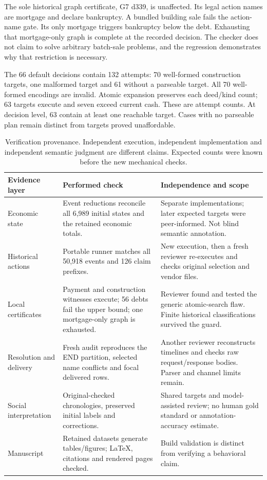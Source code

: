 The sole historical graph certificate, G7 d339, is unaffected. Its legal action names are mortgage and declare bankruptcy. A bundled building sale fails the action-name gate. Its only mortgage triggers bankruptcy below the debt. Exhausting that mortgage-only graph is complete at the recorded decision. The checker does not claim to solve arbitrary batch-sale problems, and the regression demonstrates why that restriction is necessary.

The 66 default decisions contain 132 attempts: 70 well-formed construction targets, one malformed target and 61 without a parseable target. All 70 well-formed encodings are invalid. Atomic expansion preserves each deed/kind count; 63 targets execute and seven exceed current cash. These are attempt counts. At decision level, 63 contain at least one reachable target. Cases with no parseable plan remain distinct from targets proved unaffordable.



\begin{table}[htbp]
\centering\small
\begin{tabularx}{\linewidth}{@{}L{2.9cm}YY@{}}
\toprule
Evidence layer & Performed check & Independence and scope\\\midrule
Economic state & Event reductions reconcile all 6,989 initial states and the retained economic totals. & Separate implementations; later expected targets were peer-informed. Not blind semantic annotation.\\
Historical actions & Portable runner matches all 50,918 events and 126 claim prefixes. & New execution, then a fresh reviewer re-executes and checks original selection and vendor files.\\
Local certificates & Payment and construction witnesses execute; 56 debts fail the upper bound; one mortgage-only graph is exhausted. & Reviewer found and tested the generic atomic-search flaw. Finite historical classifications survived the guard.\\
Resolution and delivery & Fresh audit reproduces the END partition, selected name conflicts and focal delivered rows. & Another reviewer reconstructs timelines and checks raw request/response bodies. Parser and channel limits remain.\\
Social interpretation & Original-checked chronologies, preserved initial labels and corrections. & Shared targets and model-assisted review; no human gold standard or annotation-accuracy estimate.\\
Manuscript & Retained datasets generate tables/figures; LaTeX, citations and rendered pages checked. & Build validation is distinct from verifying a behavioral claim.\\
\bottomrule
\end{tabularx}
\caption{Verification provenance. Independent execution, independent implementation and independent semantic judgment are different claims. Expected counts were known before the new mechanical checks.}
\label{tab:verification-provenance}
\end{table}
